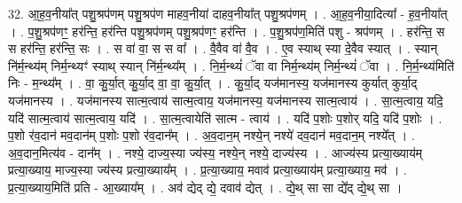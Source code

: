 \documentclass[17pt]{extarticle}
\begin{document}
32. आ॒ह॒व॒नीया᳚त् पशु॒श्रप॑णम् पशु॒श्रप॑ण माहव॒नीया॑ दाहव॒नीया᳚त् पशु॒श्रप॑णम् । . आ॒ह॒व॒नीया॒दित्या᳚ - ह॒व॒नीया᳚त् । . प॒शु॒श्रप॑णꣳ॒॒ हर॑न्ति॒ हर॑न्ति पशु॒श्रप॑णम् पशु॒श्रप॑णꣳ॒॒ हर॑न्ति । . प॒शु॒श्रप॑ण॒मिति॑ पशु - श्रप॑णम् । . हर॑न्ति॒ स स हर॑न्ति॒ हर॑न्ति॒ सः । . स वा॑ वा॒ स स वा᳚ । . वै॒वैव वा॑ वै॒व । . ए॒व स्याथ् स्या दे॒वैव स्यात् । . स्यान् नि॑र्म॒न्थ्य॑म् निर्म॒न्थ्यꣳ॑ स्याथ् स्यान् नि॑र्म॒न्थ्य᳚म् । . नि॒र्म॒न्थ्यं॑ ॅवा वा निर्म॒न्थ्य॑म् निर्म॒न्थ्यं॑ ॅवा । . नि॒र्म॒न्थ्य॑मिति॑ निः - म॒न्थ्य᳚म् । . वा॒ कु॒र्या॒त् कु॒र्या॒द् वा॒ वा॒ कु॒र्या॒त् । . कु॒र्या॒द् यज॑मानस्य॒ यज॑मानस्य कुर्यात् कुर्या॒द् यज॑मानस्य । . यज॑मानस्य सात्म॒त्वाय॑ सात्म॒त्वाय॒ यज॑मानस्य॒ यज॑मानस्य सात्म॒त्वाय॑ । . सा॒त्म॒त्वाय॒ यदि॒ यदि॑ सात्म॒त्वाय॑ सात्म॒त्वाय॒ यदि॑ । . सा॒त्म॒त्वायेति॑ सात्म - त्वाय॑ । . यदि॑ प॒शोः प॒शोर् यदि॒ यदि॑ प॒शोः । . प॒शो र॑व॒दान॑ मव॒दान॑म् प॒शोः प॒शो र॑व॒दान᳚म् । . अ॒व॒दान॒म् नश्ये॒न् नश्ये॑ दव॒दान॑ मव॒दान॒म् नश्ये᳚त् । . अ॒व॒दान॒मित्य॑व - दान᳚म् । . नश्ये॒ दाज्य॒स्या ज्य॑स्य॒ नश्ये॒न् नश्ये॒ दाज्य॑स्य । . आज्य॑स्य प्रत्या॒ख्याय॑म् प्रत्या॒ख्याय॒ माज्य॒स्या ज्य॑स्य प्रत्या॒ख्याय᳚म् । . प्र॒त्या॒ख्याय॒ मवाव॑ प्रत्या॒ख्याय॑म् प्रत्या॒ख्याय॒ मव॑ । . प्र॒त्या॒ख्याय॒मिति॑ प्रति - आ॒ख्याय᳚म् । . अव॑ द्येद् द्ये॒ दवाव॑ द्येत् । . द्ये॒थ् सा सा द्ये᳚द् द्ये॒थ् सा । \newline
\end{document}
